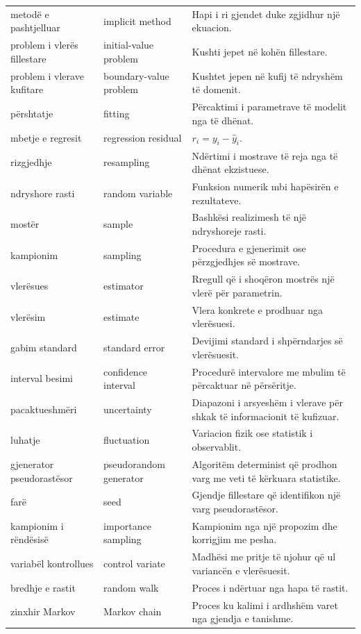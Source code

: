 \documentclass[11pt,oneside,openany]{book}
\begin{document}
\begin{longtable}{p{}p{}p{}}
metodë e pashtjelluar & implicit method & Hapi i ri gjendet duke zgjidhur një ekuacion.\\
problem i vlerës fillestare & initial-value problem & Kushti jepet në kohën fillestare.\\
problem i vlerave kufitare & boundary-value problem & Kushtet jepen në kufij të ndryshëm të domenit.\\
përshtatje & fitting & Përcaktimi i parametrave të modelit nga të dhënat.\\
mbetje e regresit & regression residual & $r_i=y_i-\hat y_i$.\\
rizgjedhje & resampling & Ndërtimi i mostrave të reja nga të dhënat ekzistuese.\\
ndryshore rasti & random variable & Funksion numerik mbi hapësirën e rezultateve.\\
mostër & sample & Bashkësi realizimesh të një ndryshoreje rasti.\\
kampionim & sampling & Procedura e gjenerimit ose përzgjedhjes së mostrave.\\
vlerësues & estimator & Rregull që i shoqëron mostrës një vlerë për parametrin.\\
vlerësim & estimate & Vlera konkrete e prodhuar nga vlerësuesi.\\
gabim standard & standard error & Devijimi standard i shpërndarjes së vlerësuesit.\\
interval besimi & confidence interval & Procedurë intervalore me mbulim të përcaktuar në përsëritje.\\
pacaktueshmëri & uncertainty & Diapazoni i arsyeshëm i vlerave për shkak të informacionit të kufizuar.\\
luhatje & fluctuation & Variacion fizik ose statistik i observablit.\\
gjenerator pseudorastësor & pseudorandom generator & Algoritëm determinist që prodhon varg me veti të kërkuara statistike.\\
farë & seed & Gjendje fillestare që identifikon një varg pseudorastësor.\\
kampionim i rëndësisë & importance sampling & Kampionim nga një propozim dhe korrigjim me pesha.\\
variabël kontrollues & control variate & Madhësi me pritje të njohur që ul variancën e vlerësuesit.\\
bredhje e rastit & random walk & Proces i ndërtuar nga hapa të rastit.\\
zinxhir Markov & Markov chain & Proces ku kalimi i ardhshëm varet nga gjendja e tanishme.\\

\end{longtable}
\end{document}

